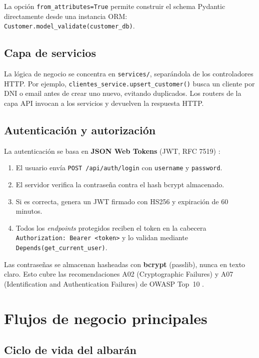 \documentclass[12pt,twoside,titlepage]{report}
\begin{document}
La opción \texttt{from\_attributes=True} permite construir el schema Pydantic directamente desde una instancia ORM: \texttt{Customer.model\_validate(customer\_db)}.

\subsection{Capa de servicios}

La lógica de negocio se concentra en \texttt{services/}, separándola de los controladores HTTP. Por ejemplo, \texttt{clientes\_service.upsert\_customer()} busca un cliente por DNI o email antes de crear uno nuevo, evitando duplicados. Los routers de la capa API invocan a los servicios y devuelven la respuesta HTTP.

\subsection{Autenticación y autorización}

La autenticación se basa en \textbf{JSON Web Tokens} (JWT, RFC 7519) \cite{rfc7519}:

\begin{enumerate}[nosep]
  \item El usuario envía \texttt{POST /api/auth/login} con \texttt{username} y \texttt{password}.
  \item El servidor verifica la contraseña contra el hash bcrypt almacenado.
  \item Si es correcta, genera un JWT firmado con HS256 y expiración de 60 minutos.
  \item Todos los \emph{endpoints} protegidos reciben el token en la cabecera \texttt{Authorization: Bearer <token>} y lo validan mediante \texttt{Depends(get\_current\_user)}.
\end{enumerate}

Las contraseñas se almacenan hasheadas con \textbf{bcrypt} (passlib), nunca en texto claro. Esto cubre las recomendaciones A02 (Cryptographic Failures) y A07 (Identification and Authentication Failures) de OWASP Top~10 \cite{owasp2021}.


\section{Flujos de negocio principales}

\subsection{Ciclo de vida del albarán}
\end{document}
